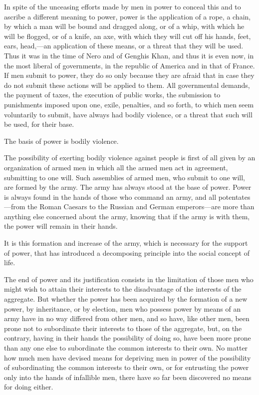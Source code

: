 \documentclass{book}
\begin{document}
In spite of the unceasing efforts made by men in power to conceal this and to ascribe a different meaning to power, power is the application of a rope, a chain, by which a man will be bound and dragged along, or of a whip, with which he will be flogged, or of a knife, an axe, with which they will cut off his hands, feet, ears, head,—an application of these means, or a threat that they will be used. Thus it was in the time of Nero and of Genghis Khan, and thus it is even now, in the most liberal of governments, in the republic of America and in that of France. If men submit to power, they do so only because they are afraid that in case they do not submit these actions will be applied to them. All governmental demands, the payment of taxes, the execution of public works, the submission to punishments imposed upon one, exile, penalties, and so forth, to which men seem voluntarily to submit, have always had bodily violence, or a threat that such will be used, for their base.

The basis of power is bodily violence.

The possibility of exerting bodily violence against people is first of all given by an organization of armed men in which all the armed men act in agreement, submitting to one will. Such assemblies of armed men, who submit to one will, are formed by the army. The army has always stood at the base of power. Power is always found in the hands of those who command an army, and all potentates—from the Roman Caesars to the Russian and German emperors—are more than anything else concerned about the army, knowing that if the army is with them, the power will remain in their hands.

It is this formation and increase of the army, which is necessary for the support of power, that has introduced a decomposing principle into the social concept of life.

The end of power and its justification consists in the limitation of those men who might wish to attain their interests to the disadvantage of the interests of the aggregate. But whether the power has been acquired by the formation of a new power, by inheritance, or by election, men who possess power by means of an army have in no way differed from other men, and so have, like other men, been prone not to subordinate their interests to those of the aggregate, but, on the contrary, having in their hands the possibility of doing so, have been more prone than any one else to subordinate the common interests to their own. No matter how much men have devised means for depriving men in power of the possibility of subordinating the common interests to their own, or for entrusting the power only into the hands of infallible men, there have so far been discovered no means for doing either.
\end{document}
